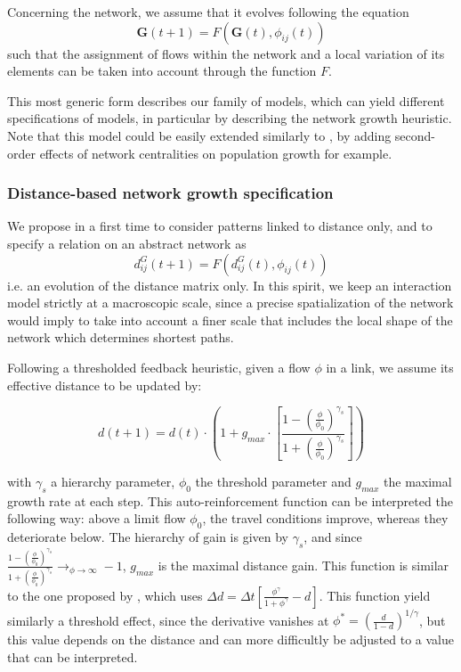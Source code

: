 \documentclass[11pt]{article}
\begin{document}
Concerning the network, we assume that it evolves following the equation
\begin{equation}
\mathbf{G}(t + 1) = F(\mathbf{G}(t),\phi_{ij}(t))
\end{equation}
such that the assignment of flows within the network and a local variation of its elements can be taken into account through the function $F$.

This most generic form describes our family of models, which can yield different specifications of models, in particular by describing the network growth heuristic. Note that this model could be easily extended similarly to \cite{raimbault2018indirect}, by adding second-order effects of network centralities on population growth for example.

\subsubsection{Distance-based network growth specification}

We propose in a first time to consider patterns linked to distance only, and to specify a relation on an abstract network as
\begin{equation}
d^G_{ij}(t+1) = F(d^G_{ij}(t),\phi_{ij}(t))
\end{equation}
i.e. an evolution of the distance matrix only. In this spirit, we keep an interaction model strictly at a macroscopic scale, since a precise spatialization of the network would imply to take into account a finer scale that includes the local shape of the network which determines shortest paths.


Following a thresholded feedback heuristic, given a flow $\phi$ in a link, we assume its effective distance to be updated by:

\begin{equation}
d(t+1) = d(t)\cdot \left( 1 + g_{max} \cdot \left[\frac{1 - \left(\frac{\phi}{\phi_0}\right)^{\gamma_s}}{1 + \left(\frac{\phi}{\phi_0}\right)^{\gamma_s}}\right]\right)
\end{equation}

with $\gamma_s$ a hierarchy parameter, $\phi_0$ the threshold parameter and $g_{max}$ the maximal growth rate at each step. This auto-reinforcement function can be interpreted the following way: above a limit flow $\phi_0$, the travel conditions improve, whereas they deteriorate below. The hierarchy of gain is given by $\gamma_s$, and since $\frac{1 - \left(\frac{\phi}{\phi_0}\right)^{\gamma_s}}{1 + \left(\frac{\phi}{\phi_0}\right)^{\gamma_s}} \rightarrow_{\phi\rightarrow \infty} -1$, $g_{max}$ is the maximal distance gain. This function is similar to the one proposed by \cite{tero2007mathematical}, which uses $\Delta d = \Delta t \left[ \frac{\phi^\gamma}{1 + \phi^\gamma} - d\right]$. This function yield similarly a threshold effect, since the derivative vanishes at $\phi^{\ast} = \left(\frac{d}{1 - d}\right)^{1/\gamma}$, but this value depends on the distance and can more difficultly be adjusted to a value that can be interpreted.
\end{document}
